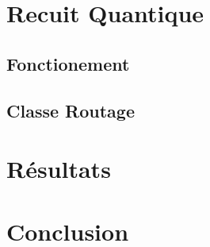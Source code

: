 \documentclass{article}%
\begin{document}
\section{Recuit Quantique}
\subsection{Fonctionement}
\subsection{Classe Routage}

\section{Résultats}


\section*{Conclusion}

\listoffigures

\end{document}
